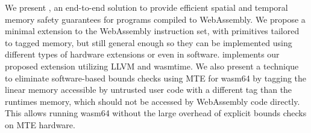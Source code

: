 We present \projectname{}, an end-to-end solution to provide efficient spatial and temporal memory safety guarantees for programs compiled to WebAssembly.
We propose a minimal extension to the WebAssembly instruction set, with primitives tailored to tagged memory, but still general enough so they can be implemented using different types of hardware extensions or even in software.
\projectname{} implements our proposed extension utilizing LLVM and wasmtime.
We also present a technique to eliminate software-based bounds checks using MTE for wasm64 by tagging the linear memory accessible by untrusted user code with a different tag than the runtimes memory, which should not be accessed by WebAssembly code directly.
This allows running wasm64 without the large overhead of explicit bounds checks on MTE hardware.
